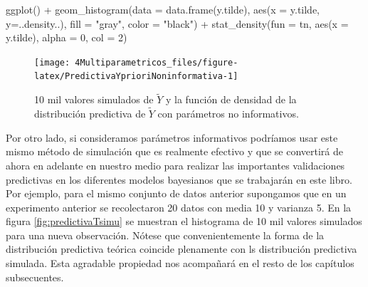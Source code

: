 \documentclass[
  10pt,
  spanish,
]{book}
\newenvironment{Shaded}{\begin{snugshade}}{\end{snugshade}}
\newcommand{\AttributeTok}[1]{\textcolor[rgb]{0.77,0.63,0.00}{#1}}
\newcommand{\DecValTok}[1]{\textcolor[rgb]{0.00,0.00,0.81}{#1}}
\newcommand{\FunctionTok}[1]{\textcolor[rgb]{0.00,0.00,0.00}{#1}}
\newcommand{\NormalTok}[1]{#1}
\newcommand{\SpecialCharTok}[1]{\textcolor[rgb]{0.00,0.00,0.00}{#1}}
\newcommand{\StringTok}[1]{\textcolor[rgb]{0.31,0.60,0.02}{#1}}
\theoremstyle{definition}
\theoremstyle{definition}
\theoremstyle{definition}
\theoremstyle{definition}
\theoremstyle{remark}
\begin{document}
\begin{Shaded}
\begin{Highlighting}[]
\FunctionTok{ggplot}\NormalTok{() }\SpecialCharTok{+} 
  \FunctionTok{geom\_histogram}\NormalTok{(}\AttributeTok{data =} \FunctionTok{data.frame}\NormalTok{(y.tilde),}
                 \FunctionTok{aes}\NormalTok{(}\AttributeTok{x =}\NormalTok{ y.tilde, }\AttributeTok{y=}\NormalTok{..density..),}
                 \AttributeTok{fill =} \StringTok{"gray"}\NormalTok{,}
                 \AttributeTok{color =} \StringTok{"black"}\NormalTok{) }\SpecialCharTok{+}
  \FunctionTok{stat\_density}\NormalTok{(}\AttributeTok{fun =}\NormalTok{ tn, }\FunctionTok{aes}\NormalTok{(}\AttributeTok{x =}\NormalTok{ y.tilde), }\AttributeTok{alpha =} \DecValTok{0}\NormalTok{, }\AttributeTok{col =} \DecValTok{2}\NormalTok{) }
\end{Highlighting}
\end{Shaded}

\begin{figure}

{\centering \texttt{[image: 4Multiparametricos\_files/figure-latex/PredictivaYprioriNoninformativa-1]} 

}

\caption{10 mil valores simulados de $\tilde{Y}$ y la función de densidad de la distribución predictiva de $\tilde{Y}$ con parámetros no informativos.}\label{fig:PredictivaYprioriNoninformativa}
\end{figure}

Por otro lado, si consideramos parámetros informativos podríamos usar este mismo método de simulación que es realmente efectivo y que se convertirá de ahora en adelante en nuestro medio para realizar las importantes validaciones predictivas en los diferentes modelos bayesianos que se trabajarán en este libro. Por ejemplo, para el mismo conjunto de datos anterior supongamos que en un experimento anterior se recolectaron 20 datos con media 10 y varianza 5. En la figura \ref{fig:predictivaTsimu} se muestran el histograma de 10 mil valores simulados para una nueva observación. Nótese que convenientemente la forma de la distribución predictiva teórica coincide plenamente con ls distribución predictiva simulada. Esta agradable propiedad nos acompañará en el resto de los capítulos subsecuentes.
\end{document}
